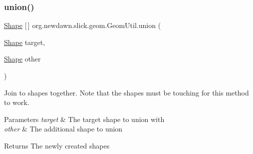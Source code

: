 \subsubsection{\texorpdfstring{union()}{union()}}
{\footnotesize\ttfamily \mbox{\hyperlink{classorg_1_1newdawn_1_1slick_1_1geom_1_1_shape}{Shape}} \mbox{[}$\,$\mbox{]} org.\+newdawn.\+slick.\+geom.\+Geom\+Util.\+union (\begin{DoxyParamCaption}\item[{\mbox{\hyperlink{classorg_1_1newdawn_1_1slick_1_1geom_1_1_shape}{Shape}}}]{target,  }\item[{\mbox{\hyperlink{classorg_1_1newdawn_1_1slick_1_1geom_1_1_shape}{Shape}}}]{other }\end{DoxyParamCaption})\hspace{0.3cm}{\ttfamily [inline]}}

Join to shapes together. Note that the shapes must be touching for this method to work.


\begin{DoxyParams}{Parameters}
{\em target} & The target shape to union with \\
\hline
{\em other} & The additional shape to union \\
\hline
\end{DoxyParams}
\begin{DoxyReturn}{Returns}
The newly created shapes 
\end{DoxyReturn}

